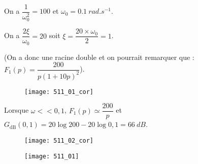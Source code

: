 \normaltrue \difficilefalse \tdifficilefalse
\correctionfalse


\setcounter{question}{0}%
\ifcorrection
\else
{}
\fi


\ifprof 
\else
 \fi
 
\ifprof
On a $\dfrac{1}{\omega_0^2} = {100}$ et $\omega_0 = \SI{0,1}{rad.s^{-1}}$.

On a $\dfrac{2\xi}{\omega_0}= {20}$ soit $\xi = \dfrac{20\times \omega_0}{2 }= 1$.

(On a donc une racine double et on pourrait remarquer que : 
$F_1(p)=\dfrac{200}{p\left(1+10p\right)^2}$).

\begin{figure}[!h]
\texttt{[image: 511\_01\_cor]}
\end{figure}

Lorsque $\omega << 0,1$, $F_1(p) \simeq \dfrac{200}{p}$ et $G_{\text{dB}}(0,1) = 20\log 200 - 20 \log 0,1 = \SI{66}{dB}$.
\begin{figure}[!h]
\texttt{[image: 511\_02\_cor]}
\end{figure}

\else 
\begin{figure}[!h]
\texttt{[image: 511\_01]}
\end{figure}
\fi






 

\ifprof
\else


\fi